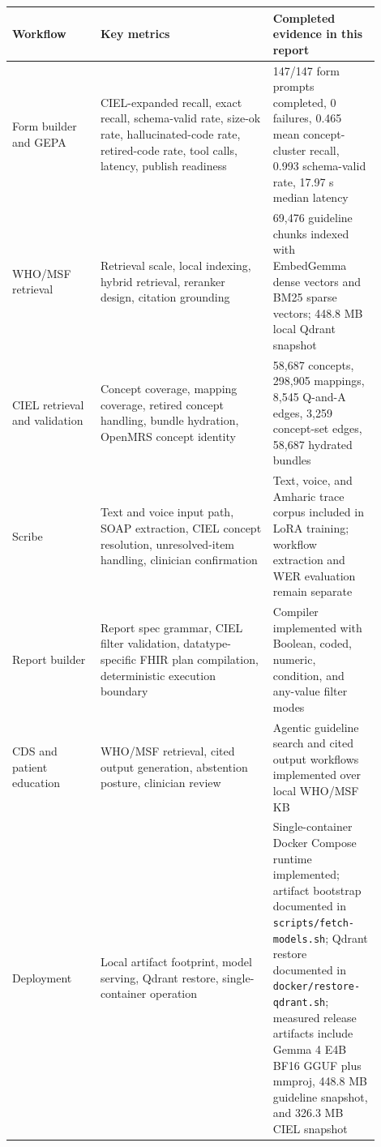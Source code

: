 \documentclass[11pt]{article}
\begin{document}
\begin{longtable}{p{0.22\linewidth}p{0.43\linewidth}p{0.25\linewidth}}
\toprule
\textbf{Workflow} & \textbf{Key metrics} & \textbf{Completed evidence in this report} \\
\midrule
Form builder and GEPA & CIEL-expanded recall, exact recall, schema-valid rate, size-ok rate, hallucinated-code rate, retired-code rate, tool calls, latency, publish readiness & 147/147 form prompts completed, 0 failures, 0.465 mean concept-cluster recall, 0.993 schema-valid rate, 17.97 s median latency \\
\addlinespace
WHO/MSF retrieval & Retrieval scale, local indexing, hybrid retrieval, reranker design, citation grounding & 69,476 guideline chunks indexed with EmbedGemma dense vectors and BM25 sparse vectors; 448.8 MB local Qdrant snapshot \\
\addlinespace
CIEL retrieval and validation & Concept coverage, mapping coverage, retired concept handling, bundle hydration, OpenMRS concept identity & 58,687 concepts, 298,905 mappings, 8,545 Q-and-A edges, 3,259 concept-set edges, 58,687 hydrated bundles \\
\addlinespace
Scribe & Text and voice input path, SOAP extraction, CIEL concept resolution, unresolved-item handling, clinician confirmation & Text, voice, and Amharic trace corpus included in LoRA training; workflow extraction and WER evaluation remain separate \\
\addlinespace
Report builder & Report spec grammar, CIEL filter validation, datatype-specific FHIR plan compilation, deterministic execution boundary & Compiler implemented with Boolean, coded, numeric, condition, and any-value filter modes \\
\addlinespace
CDS and patient education & WHO/MSF retrieval, cited output generation, abstention posture, clinician review & Agentic guideline search and cited output workflows implemented over local WHO/MSF KB \\
\addlinespace
Deployment & Local artifact footprint, model serving, Qdrant restore, single-container operation & Single-container Docker Compose runtime implemented; artifact bootstrap documented in \texttt{scripts/fetch-models.sh}; Qdrant restore documented in \texttt{docker/restore-qdrant.sh}; measured release artifacts include Gemma 4 E4B BF16 GGUF plus mmproj, 448.8 MB guideline snapshot, and 326.3 MB CIEL snapshot \\
\bottomrule
\end{longtable}
\end{document}
